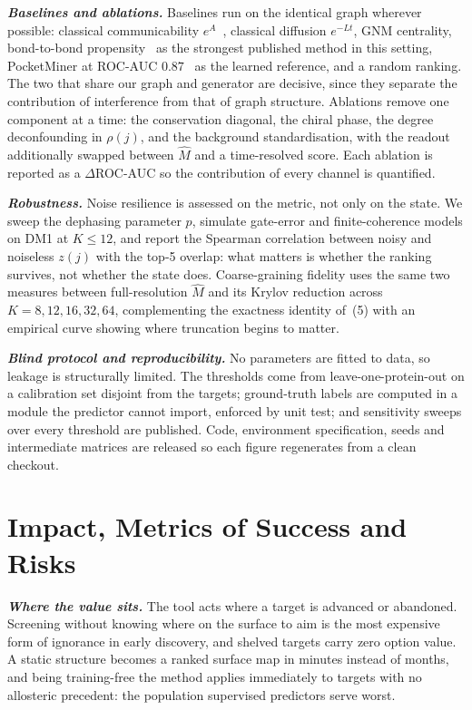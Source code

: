 \documentclass[10pt,a4paper]{article}
\newcommand{\Mhat}{\hat{M}}
\newcommand{\lead}[1]{\textbf{\textit{#1}}}
\begin{document}
\lead{Baselines and ablations.} Baselines run on the identical graph wherever possible: classical communicability
$e^{A}$~\cite{estrada2008}, classical diffusion $e^{-Lt}$, GNM centrality, bond-to-bond
propensity~\cite{amor2016} as the strongest published method in this setting, PocketMiner at ROC-AUC
$0.87$~\cite{meller2023} as the learned reference, and a random ranking. The two that share our graph
and generator are decisive, since they separate the contribution of interference from that of graph
structure. Ablations remove one component at a time: the conservation diagonal, the chiral phase, the
degree deconfounding in $\rho(j)$, and the background standardisation, with the readout additionally
swapped between $\Mhat$ and a time-resolved score. Each ablation is reported as a $\Delta$ROC-AUC so
the contribution of every channel is quantified.

\lead{Robustness.} Noise resilience is assessed on the metric, not only on the state. We sweep the dephasing parameter
$p$, simulate gate-error and finite-coherence models on DM1 at $K\le 12$, and report the Spearman
correlation between noisy and noiseless $z(j)$ with the top-5 overlap: what matters is whether the
ranking survives, not whether the state does. Coarse-graining fidelity uses the same two measures
between full-resolution $\Mhat$ and its Krylov reduction across $K=8,12,16,32,64$, complementing the
exactness identity of~(5) with an empirical curve showing where truncation begins to matter.

\lead{Blind protocol and reproducibility.} No parameters are fitted to data, so leakage is structurally limited. The thresholds come from
leave-one-protein-out on a calibration set disjoint from the targets; ground-truth labels are
computed in a module the predictor cannot import, enforced by unit test; and sensitivity sweeps over
every threshold are published. Code, environment specification, seeds and intermediate matrices are
released so each figure regenerates from a clean checkout.

\section{Impact, Metrics of Success and Risks}

\lead{Where the value sits.} The tool acts where a target is advanced or abandoned. Screening without
knowing where on the surface to aim is the most expensive form of ignorance in early discovery, and
shelved targets carry zero option value. A static structure becomes a ranked surface map in minutes
instead of months, and being training-free the method applies immediately to targets with no
allosteric precedent: the population supervised predictors serve worst.
\end{document}
